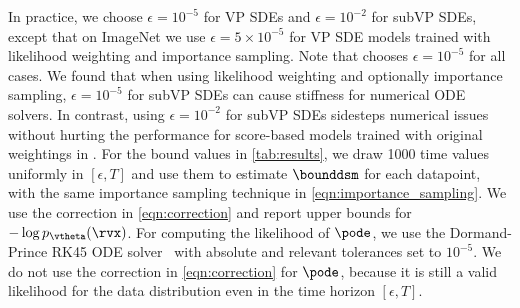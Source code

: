 In practice, we choose $\epsilon = 10^{-5}$ for VP SDEs and $\epsilon = 10^{-2}$ for subVP SDEs, except that on ImageNet we use $\epsilon = 5 \times 10^{-5}$ for VP SDE models trained with likelihood weighting and importance sampling. Note that \cite{song2020score} chooses $\epsilon = 10^{-5}$ for all cases. We found that when using likelihood weighting and optionally importance sampling, $\epsilon=10^{-5}$ for subVP SDEs can cause stiffness for numerical ODE solvers. In contrast, using $\epsilon=10^{-2}$ for subVP SDEs sidesteps numerical issues without hurting the performance for score-based models trained with original weightings in \cite{song2020score}. For the bound values in \cref{tab:results}, we draw 1000 time values uniformly in $[\epsilon, T]$ and use them to estimate $\bounddsm$ for each datapoint, with the same importance sampling technique in \cref{eqn:importance_sampling}. We use the correction in \cref{eqn:correction} and report upper bounds for $-\log p_\vtheta(\rvx)$. For computing the likelihood of $\pode$, we use the Dormand-Prince RK45 ODE solver~\cite{dormand1980family} with absolute and relevant tolerances set to $10^{-5}$. We do not use the correction in \cref{eqn:correction} for $\pode$, because it is still a valid likelihood for the data distribution even in the time horizon $[\epsilon, T]$.

